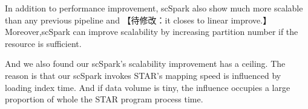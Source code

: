 \documentclass[conference]{IEEEtran}
\begin{document}
  In addition to performance improvement, scSpark also show much more scalable than any previous pipeline and 【待修改：it closes to linear improve.】
  Moreover,scSpark can improve scalability by increasing partition number if the resource is sufficient.
  
  And we also found our scSpark's scalability improvement has a ceiling. 
  The reason is that our scSpark invokes STAR's mapping speed is influenced by loading index time. 
  And if data volume is tiny, the influence occupies a large proportion of whole the STAR program process time. 







\end{document}
